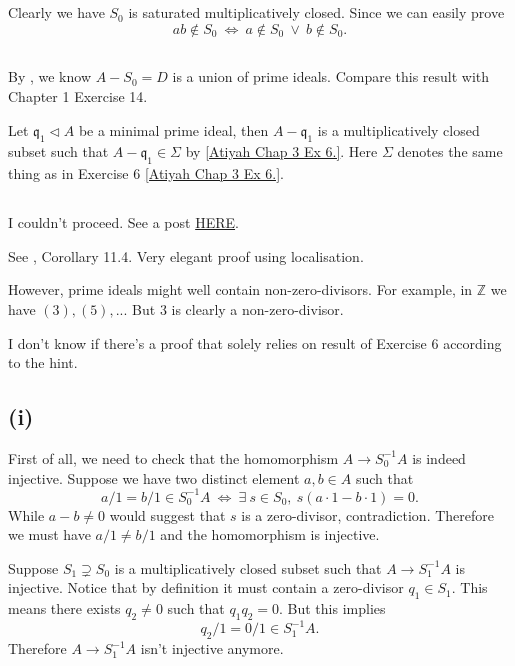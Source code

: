 \subsection{}
	Clearly we have $S_0$ is saturated multiplicatively closed. Since we can easily prove 
	\[ab\notin S_0 ~\Leftrightarrow~ a\notin S_0 ~\lor~ b\notin S_0.\]


\subsection{}

By , we know $A-S_0=D$ is a union of prime ideals. Compare this result with Chapter 1 Exercise 14.

Let $\mathfrak q_1\triangleleft A$ be a minimal prime ideal, then $A-\mathfrak q_1$ is a multiplicatively closed subset such that $A-\mathfrak q_1\in\Sigma$ by \ref{Atiyah Chap 3 Ex 6.}.
Here $\Sigma$ denotes the same thing as in Exercise 6 \ref{Atiyah Chap 3 Ex 6.}.

\subsection{}

I couldn't proceed. See a post \href{https://mathoverflow.net/questions/67382/minimal-primes-and-zero-divisors}{HERE}.

See \cite{altman}, Corollary 11.4. Very elegant proof using localisation. 

However, prime ideals might well contain non-zero-divisors. For example, in $\mathbb Z$ we have $(3), (5),...$ But $3$ is clearly a non-zero-divisor.

I don't know if there's a proof that solely relies on result of Exercise 6 according to the hint.


\subsection{(i)}

First of all, we need to check that the homomorphism $A\to S_0^{-1}A$ is indeed injective. Suppose we have two distinct element $a,b\in A$ such that \[a/1=b/1\in S_0^{-1}A ~\Leftrightarrow~ \exists~s\in S_0,~ s(a\cdot 1-b\cdot 1)=0.\] While $a-b\neq 0$ would suggest that $s$ is a zero-divisor, contradiction. Therefore we must have $a/1\neq b/1$ and the homomorphism is injective. 

Suppose $S_1\supsetneq S_0$ is a multiplicatively closed subset such that $A\to S_1^{-1}A$ is injective. Notice that by definition it must contain a zero-divisor $q_1\in S_1$. This means there exists $q_2\neq 0$ such that $q_1q_2=0$. But this implies \[q_2/1=0/1\in S_1^{-1}A.\] Therefore $A\to S_1^{-1}A$ isn't injective anymore. 

